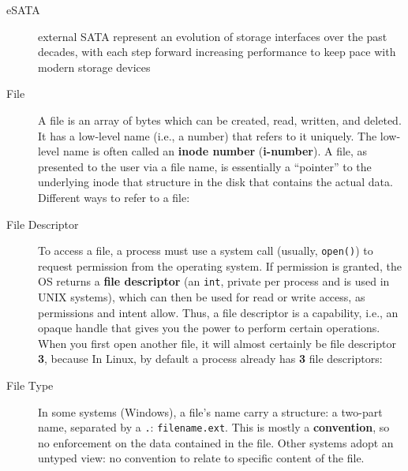 \begin{description}
\item[eSATA] external SATA represent an evolution of storage interfaces over the past decades, with each step forward increasing performance to keep pace with modern storage devices

\item[File] A file is an array of bytes which can be created, read, written, and deleted. It has a low-level name (i.e., a number) that refers to it uniquely. The low-level name is often called an \textbf{inode number} (\textbf{i-number}).  A file, as presented to the user via a file name, is essentially a “pointer” to the underlying inode that structure in the disk that contains the actual data. Different ways to refer to a file:

\item[File Descriptor] To access a file, a process must use a system call (usually, \texttt{open()}) to request permission from the operating system. If permission is granted, the OS returns a \textbf{file descriptor} (an \texttt{int}, private per process and is used in UNIX systems), which can then be used for read or write access, as permissions and intent allow.  Thus, a file descriptor is a capability, i.e., an opaque handle that gives you the power to perform certain operations.  When you first open another file, it will almost certainly be file descriptor \textbf{3}, because In Linux, by default a process already has \textbf{3} file descriptors:


\item[File Type]  In some systems (Windows), a file's name carry a structure: a two-part name, separated by a \texttt{.}: \texttt{filename.ext}. This is mostly a \textbf{convention}, so no enforcement on the data contained in the file. Other systems adopt an untyped view: no convention to relate to specific content of the file.


\end{description}
